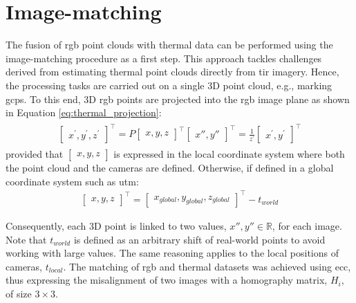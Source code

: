 \section{Image-matching}

The fusion of \acrshort{rgb} point clouds with thermal data can be performed using the image-matching procedure as a first step. This approach tackles challenges derived from estimating thermal point clouds directly from \acrshort{tir} imagery. Hence, the processing tasks are carried out on a single 3D point cloud, e.g., marking \acrshort{gcp}s. To this end, 3D \acrshort{rgb} points are projected into the \acrshort{rgb} image plane as shown in Equation \ref{eq:thermal_projection}:
\begin{gather}
    \label{eq:thermal_projection}
    \begin{aligned}
        \begin{bmatrix} x^\prime, y^\prime, z^\prime \end{bmatrix}^\intercal = P \begin{bmatrix} x, y, z\end{bmatrix}^\intercal
        \begin{bmatrix} x'', y'' \end{bmatrix}^\intercal = \frac{1}{z^\prime} \begin{bmatrix} x^\prime, y^\prime \end{bmatrix}^\intercal
    \end{aligned}
\end{gather}
provided that $\begin{bmatrix} x, y, z\end{bmatrix}$ is expressed in the local coordinate system where both the point cloud and the cameras are defined. Otherwise, if defined in a global coordinate system such as \acrshort{utm}:
\begin{gather}
    \label{eq:thermal_projection_2}
    \begin{bmatrix} x, y, z \end{bmatrix}^\intercal = \begin{bmatrix} x_{\textit{global}}, y_{\textit{global}}, z_{\textit{global}} \end{bmatrix}^\intercal - t_{\textit{world}}
\end{gather}

Consequently, each 3D point is linked to two values, $x'', y'' \in \mathbb{R}$, for each image. Note that $t_{\textit{world}}$ is defined as an arbitrary shift of real-world points to avoid working with large values. The same reasoning applies to the local positions of cameras, $t_{\textit{local}}$. The matching of \acrshort{rgb} and thermal datasets was achieved using \acrshort{ecc}, thus expressing the misalignment of two images with a homography matrix, $H_i$, of size $3\times3$.

